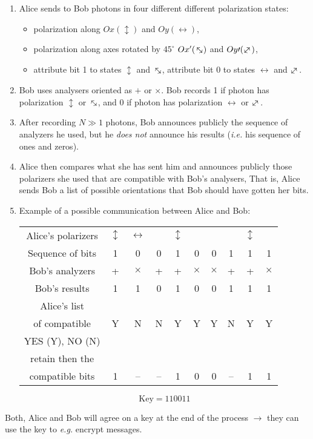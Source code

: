 \documentclass[12pt]{article}
\newcommand{\polv}{\ensuremath{\updownarrow}}
\newcommand{\polh}{\ensuremath{\leftrightarrow}}
\newcommand{\poldr}{\rotatebox[origin=c]{45}{\ensuremath{\leftrightarrow}}}
\newcommand{\poldl}{\rotatebox[origin=c]{-45}{\ensuremath{\leftrightarrow}}}
\begin{document}
\begin{enumerate}
\item Alice sends to Bob photons in four different
different polarization states:
\begin{itemize}
\item polarization along $Ox (\updownarrow)$ and $Oy (\leftrightarrow)$,
\item polarization along axes rotated by $45^\circ$ $Ox^\prime (\poldl)$ and $Oy\prime (\poldr)$,
\item attribute bit 1 to states $\updownarrow$ and $\poldl$,
      attribute bit 0 to states $\leftrightarrow$ and $\poldr$.
\end{itemize}
\item Bob uses analysers oriented as $+$ or $\times$. 
Bob records 1 if photon has
polarization $\updownarrow$ or $\poldl$, and 0 if
photon has polarization $\leftrightarrow$ or $\poldr$.
\item After recording $N \gg 1$ photons, Bob
announces publicly the sequence of 
analyzers he used, but he \emph{does not}
announce his results (\textit{i.e.} his sequence of
ones and zeros).
\item Alice then compares what she has sent
him and announces publicly those
polarizers she used that are compatible
with Bob's analysers, That is, Alice
sends Bob a list of possible orientations
that Bob should have gotten her bits.
\item Example of a possible communication
between Alice and Bob:

\begin{tabular}{cccccccccc}
\toprule
Alice's polarizers & \polv & \polh & \poldr & \polv & \poldr & \poldr & \poldl & \polv & \poldl \\
Sequence of bits & 1 & 0 & 0 & 1 & 0 & 0 & 1 & 1 & 1\\
Bob's analyzers & + & $\times$ & + & + & $\times$ & $\times$ & + & + & $\times$\\
Bob's results & 1 & 1 & 0 & 1 & 0 & 0  & 1 & 1 & 1\\
\midrule
Alice's list & \\
of compatible & Y & N & N & Y & Y & Y & N & Y & Y\\
YES (Y), NO (N) & \\
\midrule
retain then the &\\
compatible bits & 1 & -- & -- & 1 & 0 & 0 & -- & 1 & 1\\ 
\bottomrule
\end{tabular}
\[
\boxed{\text{Key} = 110011}
\]
\end{enumerate}
Both, Alice and Bob will agree on a key at the end
of the process \(\rightarrow\) they can use the key to \textit{e.g.}
encrypt messages.
\end{document}
